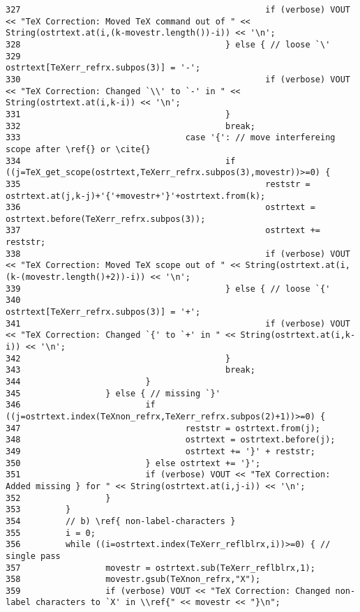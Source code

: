 \begin{verbatim}
327                                                 if (verbose) VOUT << "TeX Correction: Moved TeX command out of " << String(ostrtext.at(i,(k-movestr.length())-i)) << '\n';
328                                         } else { // loose `\'
329                                                 ostrtext[TeXerr_refrx.subpos(3)] = '-';
330                                                 if (verbose) VOUT << "TeX Correction: Changed `\\' to `-' in " << String(ostrtext.at(i,k-i)) << '\n';
331                                         }
332                                         break;
333                                 case '{': // move interfereing scope after \ref{} or \cite{}
334                                         if ((j=TeX_get_scope(ostrtext,TeXerr_refrx.subpos(3),movestr))>=0) {
335                                                 reststr = ostrtext.at(j,k-j)+'{'+movestr+'}'+ostrtext.from(k);
336                                                 ostrtext = ostrtext.before(TeXerr_refrx.subpos(3));
337                                                 ostrtext += reststr;
338                                                 if (verbose) VOUT << "TeX Correction: Moved TeX scope out of " << String(ostrtext.at(i,(k-(movestr.length()+2))-i)) << '\n';
339                                         } else { // loose `{'
340                                                 ostrtext[TeXerr_refrx.subpos(3)] = '+';
341                                                 if (verbose) VOUT << "TeX Correction: Changed `{' to `+' in " << String(ostrtext.at(i,k-i)) << '\n';
342                                         }
343                                         break;
344                         }
345                 } else { // missing `}'
346                         if ((j=ostrtext.index(TeXnon_refrx,TeXerr_refrx.subpos(2)+1))>=0) {
347                                 reststr = ostrtext.from(j);
348                                 ostrtext = ostrtext.before(j);
349                                 ostrtext += '}' + reststr;
350                         } else ostrtext += '}';
351                         if (verbose) VOUT << "TeX Correction: Added missing } for " << String(ostrtext.at(i,j-i)) << '\n';
352                 }
353         }
354         // b) \ref{ non-label-characters }
355         i = 0;
356         while ((i=ostrtext.index(TeXerr_reflblrx,i))>=0) { // single pass
357                 movestr = ostrtext.sub(TeXerr_reflblrx,1);
358                 movestr.gsub(TeXnon_refrx,"X");
359                 if (verbose) VOUT << "TeX Correction: Changed non-label characters to `X' in \\ref{" << movestr << "}\n";

\end{verbatim}
